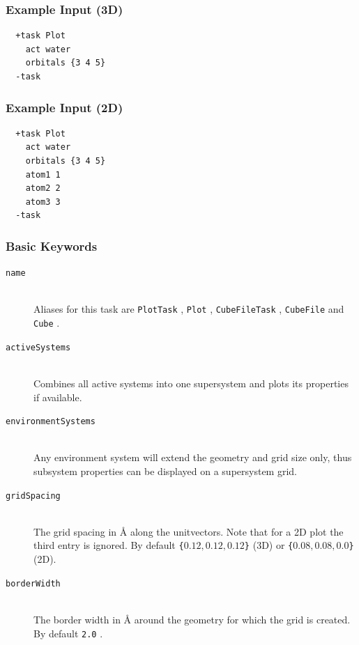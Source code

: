 \documentclass[bibliography=totocnumbered,a4paper,10pt,oneside]{scrbook}
\newcommand{\ttt}[1]{%
  \begingroup\setlength{\fboxsep}{1pt}%
  \colorbox{serenity-green!30}{\texttt{\hspace*{2pt}\vphantom{(g}#1\hspace*{2pt}}}%
  \endgroup
}
\begin{document}
\subsubsection{Example Input (3D)}
\begin{lstlisting}
  +task Plot
    act water
    orbitals {3 4 5}
  -task
\end{lstlisting}

\subsubsection{Example Input (2D)}
\begin{lstlisting}
  +task Plot
    act water
    orbitals {3 4 5}
    atom1 1
    atom2 2
    atom3 3
  -task
\end{lstlisting}

\subsubsection{Basic Keywords}
\begin{description}
   \item [\texttt{name}]\hfill \\
  Aliases for this task are \ttt{PlotTask}, \ttt{Plot}, \ttt{CubeFileTask}, \ttt{CubeFile} and \ttt{Cube}.
   \item [\texttt{activeSystems}]\hfill \\
    Combines all active systems into one supersystem and plots its properties
    if available.
   \item [\texttt{environmentSystems}]\hfill \\
    Any environment system will extend the geometry and grid size
    only, thus subsystem properties can be displayed on a supersystem grid.
    \item [\texttt{gridSpacing}]\hfill \\
    The grid spacing in \AA{} along the unitvectors. Note that for a 2D plot the third entry is
    ignored. By default \ttt{\{$0.12, 0.12, 0.12$\}} (3D) or \ttt{\{$0.08, 0.08, 0.0$\}} (2D).
    \item [\texttt{borderWidth}]\hfill \\
    The border width in \AA{} around the geometry for which the grid is created. By default \ttt{2.0}.
\end{description}
\end{document}
